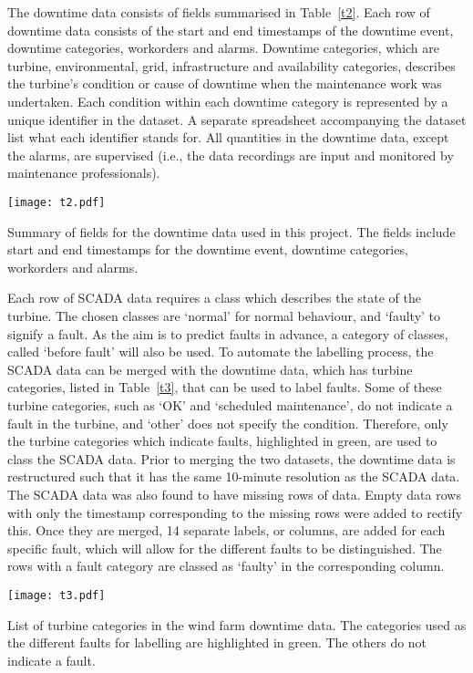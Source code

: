The downtime data consists of fields summarised in Table~\ref{t2}. Each row of downtime data consists of the start and end timestamps of the downtime event, downtime categories, workorders and alarms. Downtime categories, which are turbine, environmental, grid, infrastructure and availability categories, describes the turbine’s condition or cause of downtime when the maintenance work was undertaken. Each condition within each downtime category is represented by a unique identifier in the dataset. A separate spreadsheet accompanying the dataset list what each identifier stands for. All quantities in the downtime data, except the alarms, are supervised (i.e., the data recordings are input and monitored by maintenance professionals).

\begin{table}
    \centering
    \texttt{[image: t2.pdf]}
    \caption{\label{t2}Summary of fields for the downtime data used in this project. The fields include start and end timestamps for the downtime event, downtime categories, workorders and alarms.}
\end{table}

Each row of SCADA data requires a class which describes the state of the turbine. The chosen classes are `normal' for normal behaviour, and `faulty' to signify a fault. As the aim is to predict faults in advance, a category of classes, called `before fault' will also be used. To automate the labelling process, the SCADA data can be merged with the downtime data, which has turbine categories, listed in Table~\ref{t3}, that can be used to label faults. Some of these turbine categories, such as `OK' and `scheduled maintenance', do not indicate a fault in the turbine, and `other' does not specify the condition. Therefore, only the turbine categories which indicate faults, highlighted in green, are used to class the SCADA data. Prior to merging the two datasets, the downtime data is restructured such that it has the same 10-minute resolution as the SCADA data. The SCADA data was also found to have missing rows of data. Empty data rows with only the timestamp corresponding to the missing rows were added to rectify this. Once they are merged, 14 separate labels, or columns, are added for each specific fault, which will allow for the different faults to be distinguished. The rows with a fault category are classed as `faulty' in the corresponding column.

\begin{table}
    \centering
    \texttt{[image: t3.pdf]}
    \caption{\label{t3}List of turbine categories in the wind farm downtime data. The categories used as the different faults for labelling are highlighted in green. The others do not indicate a fault.}
\end{table}

